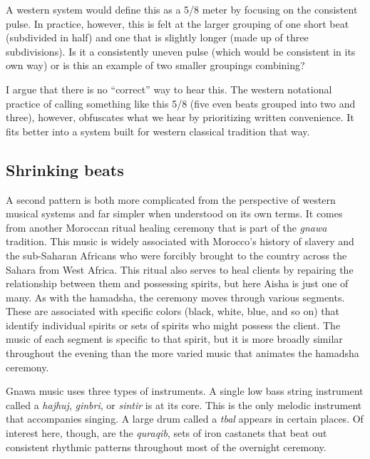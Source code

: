 \documentclass[twoside]{article}
\begin{document}
A western system would define this as a 5/8 meter by focusing on the
consistent pulse. In practice, however, this is felt at the larger
grouping of one short beat (subdivided in half) and one that is slightly
longer (made up of three subdivisions). Is it a consistently uneven
pulse (which would be consistent in its own way) or is this an example
of two smaller groupings combining?

\hypertarget{example18}{}

I argue that there is no ``correct'' way to hear this. The western
notational practice of calling something like this 5/8 (five even beats
grouped into two and three), however, obfuscates what we hear by
prioritizing written convenience. It fits better into a system built for
western classical tradition that way.

\hypertarget{shrinking-beats}{%
\subsection{Shrinking beats}\label{shrinking-beats}}

A second pattern is both more complicated from the perspective of
western musical systems and far simpler when understood on its own
terms. It comes from another Moroccan ritual healing ceremony that is
part of the \emph{gnawa} tradition. This music is widely associated with
Morocco's history of slavery and the sub-Saharan Africans who were
forcibly brought to the country across the Sahara from West Africa. This
ritual also serves to heal clients by repairing the relationship between
them and possessing spirits, but here Aisha is just one of many. As with
the hamadsha, the ceremony moves through various segments. These are
associated with specific colors (black, white, blue, and so on) that
identify individual spirits or sets of spirits who might possess the
client. The music of each segment is specific to that spirit, but it is
more broadly similar throughout the evening than the more varied music
that animates the hamadsha ceremony.

Gnawa music uses three types of instruments. A single low bass string
instrument called a \emph{hajhuj}, \emph{ginbri}, or \emph{sintir} is at
its core. This is the only melodic instrument that accompanies singing.
A large drum called a \emph{tbal} appears in certain places. Of interest
here, though, are the \emph{quraqib}, sets of iron castanets that beat
out consistent rhythmic patterns throughout most of the overnight
ceremony.
\end{document}
